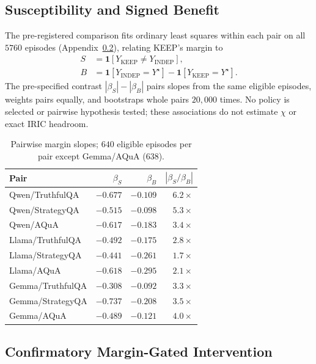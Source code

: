 \documentclass[11pt,a4paper]{article}
\theoremstyle{definition}
\newcommand{\Truth}{Y^{\star}}
\begin{document}
\subsection{Susceptibility and Signed Benefit}
\label{sec:app-smb}

The pre-registered comparison fits ordinary least squares within each pair
on all $5760$ episodes (Appendix~\ref{sec:app-sgir}), relating KEEP's margin to
\begin{align*}
S&=\mathbf1[Y_{\mathrm{KEEP}}\neq Y_{\mathrm{INDEP}}],\\
B&=\mathbf1[Y_{\mathrm{INDEP}}=\Truth]
 -\mathbf1[Y_{\mathrm{KEEP}}=\Truth].
\end{align*}
The pre-specified contrast $|\beta_S|-|\beta_B|$ pairs slopes from the same
eligible episodes, weights pairs equally, and bootstraps whole pairs
$20{,}000$ times. No policy is selected or pairwise hypothesis tested; these associations
do not estimate $\chi$ or exact IRIC headroom.

\begin{table}[H]
\centering\footnotesize
\setlength{\tabcolsep}{3pt}
\renewcommand{\arraystretch}{1.05}
\caption{Pairwise margin slopes; $640$ eligible episodes per pair except Gemma/AQuA ($638$).}
\label{tab:smb-breakdown}
\begin{tabularx}{\columnwidth}{@{}Zrrr@{}}
\toprule
Pair & $\beta_S$ & $\beta_B$ & $|\beta_S/\beta_B|$\\
\midrule
Qwen/TruthfulQA & $-0.677$ & $-0.109$ & $6.2\times$\\
Qwen/StrategyQA & $-0.515$ & $-0.098$ & $5.3\times$\\
Qwen/AQuA & $-0.617$ & $-0.183$ & $3.4\times$\\
Llama/TruthfulQA & $-0.492$ & $-0.175$ & $2.8\times$\\
Llama/StrategyQA & $-0.441$ & $-0.261$ & $1.7\times$\\
Llama/AQuA & $-0.618$ & $-0.295$ & $2.1\times$\\
Gemma/TruthfulQA & $-0.308$ & $-0.092$ & $3.3\times$\\
Gemma/StrategyQA & $-0.737$ & $-0.208$ & $3.5\times$\\
Gemma/AQuA & $-0.489$ & $-0.121$ & $4.0\times$\\
\bottomrule
\end{tabularx}
\end{table}

\subsection{Confirmatory Margin-Gated Intervention}
\label{sec:app-sgir}
\end{document}
